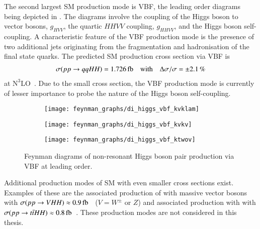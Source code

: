 The second largest SM \HH production mode is VBF, the leading order diagrams
being depicted in . The diagrams involve the coupling
of the Higgs boson to vector bosons, $g_{HVV}$, the quartic $HHVV$ coupling,
$g_{HHVV}$, and the Higgs boson self-coupling. A characteristic feature of the
VBF production mode is the presence of two additional jets originating from the
fragmentation and hadronisation of the final state quarks. The predicted SM \HH
production cross section via VBF is
\begin{align*}
  \sigma(\pp \to qqHH) = \SI{1.726}{\femto\barn}
  \quad \text{with} \quad
  \Delta \sigma / \sigma = \pm 2.1\,\%
\end{align*}
at $\text{N}^3\text{LO}$~\cite{Dreyer:2018qbw,LHCHWGHH}. Due to the small
cross section, the VBF production mode is currently of lesser importance to
probe the nature of the Higgs boson self-coupling.

\begin{figure}[htbp]
  \centering

  \begin{subfigure}{0.33\textwidth}
    \centering
    \texttt{[image: feynman\_graphs/di\_higgs\_vbf\_kvklam]}
    \subcaption{}
  \end{subfigure}\hfill%
  \begin{subfigure}{0.33\textwidth}
    \centering
    \texttt{[image: feynman\_graphs/di\_higgs\_vbf\_kvkv]}
    \subcaption{}
  \end{subfigure}\hfill%
  \begin{subfigure}{0.33\textwidth}
    \centering
    \texttt{[image: feynman\_graphs/di\_higgs\_vbf\_ktwov]}
    \subcaption{}
  \end{subfigure}

  \caption[Feynman diagrams of non-resonant Higgs boson pair production via
  VBF.]{Feynman diagrams of non-resonant Higgs boson pair production via VBF at
    leading order.}%
  \label{fig:dihiggs_vbf_feyn}
\end{figure}

Additional production modes of SM \HH with even smaller cross sections
exist. Examples of these are the associated production of \HH with massive
vector bosons with
$\sigma(\pp \to VHH) \approx \SI{0.9}{\femto\barn}$~\cite{deFlorian:2016spz}
($V = W^\pm$ or $Z$) and associated production with \ttbar with
$\sigma(\pp \to \ttbar HH) \approx
\SI{0.8}{\femto\barn}$~\cite{deFlorian:2016spz}. These production modes are not
considered in this thesis.


